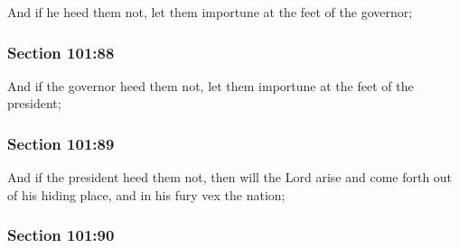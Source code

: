 		And if he heed them not, let them importune at the feet of the governor;


	\subsubsection{Section 101:88} %
		\label{DC101-88}

		And if the governor heed them not, let them importune at the feet of the president;


	\subsubsection{Section 101:89} %
		\label{DC101-89}

		And if the president heed them not, then will the Lord arise and come forth out of his hiding place, and in his fury vex the nation;


	\subsubsection{Section 101:90} %
		\label{DC101-90}


